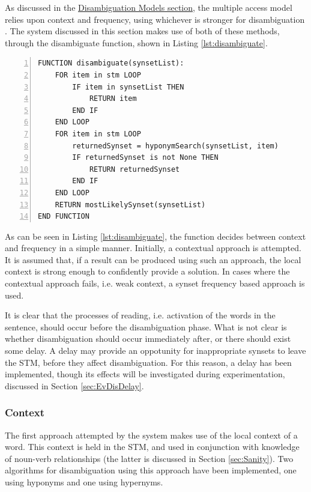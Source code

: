 \documentclass[]{article}
\begin{document}
As discussed in the \hyperref[sec:DisambiguationModels]{Disambiguation Models section}, the multiple access model relies upon context and frequency, using whichever is stronger for disambiguation \cite{PsychologyOfLanguage}. The system discussed in this section makes use of both of these methods, through the disambiguate function, shown in Listing \ref{lst:disambiguate}.

\begin{lstlisting}[numbers=left, numberstyle=\small, caption={The disambiguate function}, captionpos=b, label={lst:disambiguate}]
FUNCTION disambiguate(synsetList):
    FOR item in stm LOOP
        IF item in synsetList THEN
            RETURN item
        END IF
    END LOOP
    FOR item in stm LOOP
        returnedSynset = hyponymSearch(synsetList, item)
        IF returnedSynset is not None THEN
            RETURN returnedSynset
        END IF
    END LOOP
    RETURN mostLikelySynset(synsetList)
END FUNCTION
\end{lstlisting}

As can be seen in Listing \ref{lst:disambiguate}, the function decides between context and frequency in a simple manner. Initially, a contextual approach is attempted. It is assumed that, if a result can be produced using such an approach, the local context is strong enough to confidently provide a solution. In cases where the contextual approach fails, i.e. weak context, a synset frequency based approach is used.

It is clear that the processes of reading, i.e. activation of the words in the sentence, should occur before the disambiguation phase. What is not clear is whether disambiguation should occur immediately after, or there should exist some delay. A delay may provide an oppotunity for inappropriate synsets to leave the STM, before they affect disambiguation. For this reason, a delay has been implemented, though its effects will be investigated during experimentation, discussed in Section \ref{sec:EvDisDelay}.

\subsubsection{Context}
\label{sec:DisambiguationContext}
The first approach attempted by the system makes use of the local context of a word. This context is held in the STM, and used in conjunction with knowledge of noun-verb relationships (the latter is discussed in Section \ref{sec:Sanity}). Two algorithms for disambiguation using this approach have been implemented, one using hyponyms and one using hypernyms.
\end{document}
